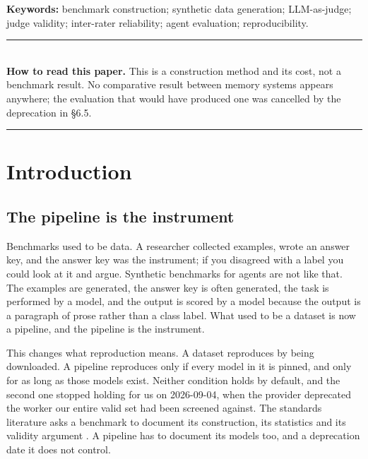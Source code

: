 \documentclass[11pt]{article}
\begin{document}
\begin{abstract}
We report the apparatus that caught these alongside the apparatus that did
not: four prespecified bars that failed and are carried as failures; a
scorer-exploit audit that failed its own literal bar; and a detector layer
built, measured at zero true positives across 19 honest flips, and discarded
the same day.
\end{abstract}

\begin{center}
\begin{minipage}{0.93\textwidth}
\small\noindent\textbf{Keywords:} benchmark construction; synthetic data
generation; LLM-as-judge; judge validity; inter-rater reliability; agent
evaluation; reproducibility.
\end{minipage}
\end{center}

\begin{center}
\begin{minipage}{0.93\textwidth}
\rule{\textwidth}{0.4pt}\\[0.55em]
\small\noindent\textbf{How to read this paper.} This is a construction
method and its cost, not a benchmark result. No comparative result between
memory systems appears anywhere;
the evaluation that would have produced one was cancelled by the deprecation
in \S6.5.
\\[0.55em]\rule{\textwidth}{0.4pt}
\end{minipage}
\end{center}

\section{Introduction}

\subsection{The pipeline is the instrument}

Benchmarks used to be data. A researcher collected examples, wrote an answer
key, and the answer key was the instrument; if you disagreed with a label you
could look at it and argue. Synthetic benchmarks for agents are not like that.
The examples are generated, the answer key is often generated, the task is
performed by a model, and the output is scored by a model because the output
is a paragraph of prose rather than a class label. What used to be a dataset
is now a pipeline, and the pipeline is the instrument.

This changes what reproduction means. A dataset reproduces by being
downloaded. A pipeline reproduces only if every model in it is pinned, and
only for as long as those models exist. Neither condition holds by default,
and the second one stopped holding for us on 2026-09-04, when the provider
deprecated the worker our entire valid set had been screened against. The
standards literature asks a benchmark to document its construction, its
statistics and its validity argument \cite{betterbench, abc, construct}. A
pipeline has to document its models too, and a deprecation date it does not
control.
\end{document}
